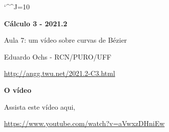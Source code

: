 \documentclass[oneside,12pt]{article}
\begin{document}
\catcode`\^^J=10

\pu

\pu


\def\drafturl{http://angg.twu.net/LATEX/2021-2-C3.pdf}
\def\drafturl{http://angg.twu.net/2021.2-C3.html}
\def\draftfooter{\tiny \href{\drafturl}{\jobname{}} \ColorBrown{\shorttoday{} \hours}}



%

\thispagestyle{empty}

\begin{center}

\vspace*{1.2cm}

{\bf \Large Cálculo 3 - 2021.2}

\bsk

Aula 7: um vídeo sobre curvas de Bézier

\bsk

Eduardo Ochs - RCN/PURO/UFF

\url{http://angg.twu.net/2021.2-C3.html}

\end{center}

\newpage



{\bf O vídeo}

Assista este vídeo aqui,

\ssk

{\footnotesize

\url{https://www.youtube.com/watch?v=aVwxzDHniEw}

}
\end{document}
